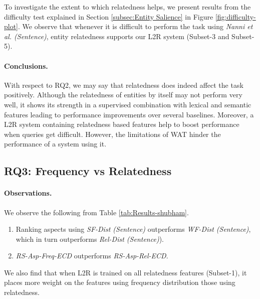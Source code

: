 To investigate the extent to which relatedness helps, we present results from the difficulty test explained in Section \ref{subsec:Entity Salience} in Figure \ref{fig:difficulty-plot}. We observe that whenever it is difficult to perform the task using \textit{Nanni et al. (Sentence)}, entity relatedness supports our L2R system (Subset-3 and Subset-5).


\paragraph{\textbf{Conclusions.}}
With respect to RQ2, we may say that relatedness does indeed affect the task positively. Although the relatedness of entities by itself may not perform very well, it shows its strength in a supervised combination with lexical and semantic features leading to performance improvements over several baselines. Moreover, a L2R system containing relatedness based features help to boost performance when queries get difficult. However, the limitations of WAT hinder the performance of a system using it. 



\subsection{RQ3: Frequency vs Relatedness}
\label{subsec:Frequency vs Relatedness}

\paragraph{\textbf{Observations.}}
We observe the following from Table \ref{tab:Results-shubham}.
\begin{enumerate}
    \item Ranking aspects using \textit{SF-Dist (Sentence)} outperforms \textit{WF-Dist (Sentence)}, which in turn outperforms \textit{Rel-Dist (Sentence)}).
    \item \textit{RS-Asp-Freq-ECD} outperforms \textit{RS-Asp-Rel-ECD}.
\end{enumerate}

We also find that when L2R is trained on all relatedness features (Subset-1), it places more weight on the features using frequency distribution those using relatedness. 

